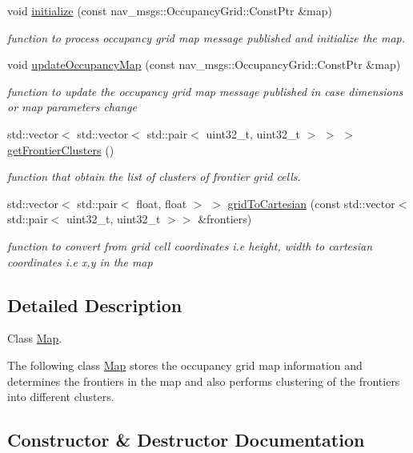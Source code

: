 \begin{DoxyCompactItemize}
void \hyperlink{classMap_afc917e8253690d0e3d5b1e31e38ce57d}{initialize} (const nav\+\_\+msgs\+::\+Occupancy\+Grid\+::\+Const\+Ptr \&map)
\begin{DoxyCompactList}\small\item\em function to process occupancy grid map message published and initialize the map. \end{DoxyCompactList}\item 
void \hyperlink{classMap_a666dee0eae4e9a7a2e9870d51459a561}{update\+Occupancy\+Map} (const nav\+\_\+msgs\+::\+Occupancy\+Grid\+::\+Const\+Ptr \&map)
\begin{DoxyCompactList}\small\item\em function to update the occupancy grid map message published in case dimensions or map parameters change \end{DoxyCompactList}\item 
std\+::vector$<$ std\+::vector$<$ std\+::pair$<$ uint32\+\_\+t, uint32\+\_\+t $>$ $>$ $>$ \hyperlink{classMap_a10129fbf19370e76f5bfdceaa32b6f7a}{get\+Frontier\+Clusters} ()
\begin{DoxyCompactList}\small\item\em function that obtain the list of clusters of frontier grid cells. \end{DoxyCompactList}\item 
std\+::vector$<$ std\+::pair$<$ float, float $>$ $>$ \hyperlink{classMap_a00f7910f42acac4789d81ec024bea6f1}{grid\+To\+Cartesian} (const std\+::vector$<$ std\+::pair$<$ uint32\+\_\+t, uint32\+\_\+t $>$$>$ \&frontiers)
\begin{DoxyCompactList}\small\item\em function to convert from grid cell coordinates i.\+e height, width to cartesian coordinates i.\+e x,y in the map \end{DoxyCompactList}\end{DoxyCompactItemize}


\subsection{Detailed Description}
Class \hyperlink{classMap}{Map}. 

The following class \hyperlink{classMap}{Map} stores the occupancy grid map information and determines the frontiers in the map and also performs clustering of the frontiers into different clusters. 

\subsection{Constructor \& Destructor Documentation}

